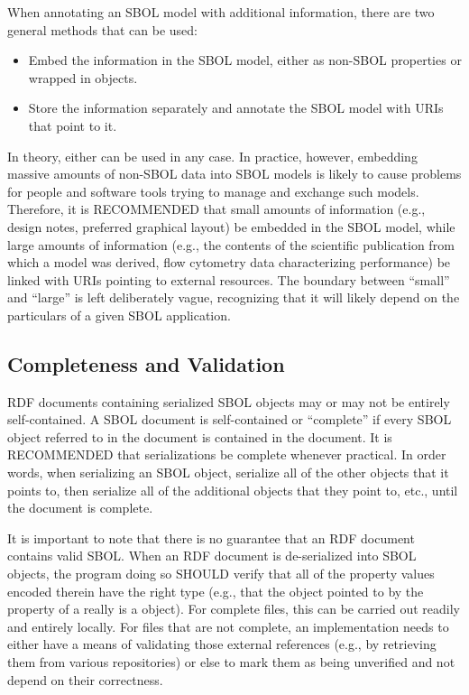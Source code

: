 When annotating an SBOL model with additional information, there are
two general methods that can be used:
\begin{itemize}
\item Embed the information in the SBOL model, either as non-SBOL
  properties or wrapped in  objects.
\item Store the information separately and annotate the SBOL model
  with URIs that point to it.
\end{itemize}
In theory, either can be used in any case.  In practice, however,
embedding massive amounts of non-SBOL data into SBOL models is likely
to cause problems for people and software tools trying to manage and
exchange such models.  Therefore, it is RECOMMENDED that small amounts of information (e.g., design notes, preferred graphical layout) be embedded in the SBOL model, while large amounts of information (e.g., the contents of the scientific publication from which a model was derived, flow cytometry data characterizing performance) be linked with URIs pointing to external resources.  The boundary between ``small'' and ``large'' is left deliberately vague, recognizing that it will likely depend on the particulars of a given SBOL application.

\subsection{Completeness and Validation}

RDF documents containing serialized SBOL objects may or may not be
entirely self-contained.  A SBOL document is self-contained or ``complete'' if every SBOL object referred to in the document is contained in the document.  It is RECOMMENDED that serializations be complete whenever practical.  In order words, when serializing an SBOL object, serialize all of the other objects that it points to, then serialize all of the additional objects that they point to, etc., until the document is complete.

It is important to note that there is no guarantee that an RDF document
contains valid SBOL. When an RDF document is de-serialized into SBOL
objects, the program doing so SHOULD verify that all of the property
values encoded therein have the right type (e.g., that the object
pointed to by the  property of a
 really is a  object).
For complete files, this can be carried out readily and entirely
locally.  For files that are not complete, an implementation needs to
either have a means of validating those external references (e.g., by
retrieving them from various repositories) or else to mark them as
being unverified and not depend on their correctness.

